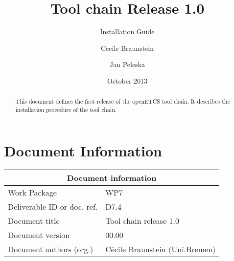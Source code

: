 \documentclass{openetcs_report}
\begin{document}
\frontmatter
{}




\title{Tool chain Release 1.0}

\subtitle{Installation Guide}

\date{October 2013}


\author{Cecile Braunstein \and Jan Peleska}







\begin{abstract}
This document defines the first release of the openETCS tool chain. It
describes the installation procedure of the tool chain.
\end{abstract}

\maketitle
\tableofcontents
\listoffiguresandtables

\newpage

\chapter{Document Information}
\begin{tabular}{|p{4.4cm}|p{8.7cm}|}
\hline
\multicolumn{2}{|c|}{Document information} \\
\hline
Work Package &  WP7  \\
Deliverable ID or doc. ref. & D7.4\\
\hline
Document title & Tool chain release 1.0 \\
Document version & 00.00 \\
Document authors (org.)  & Cécile Braunstein  (Uni.Bremen)  \\
\hline
\end{tabular}
\end{document}

